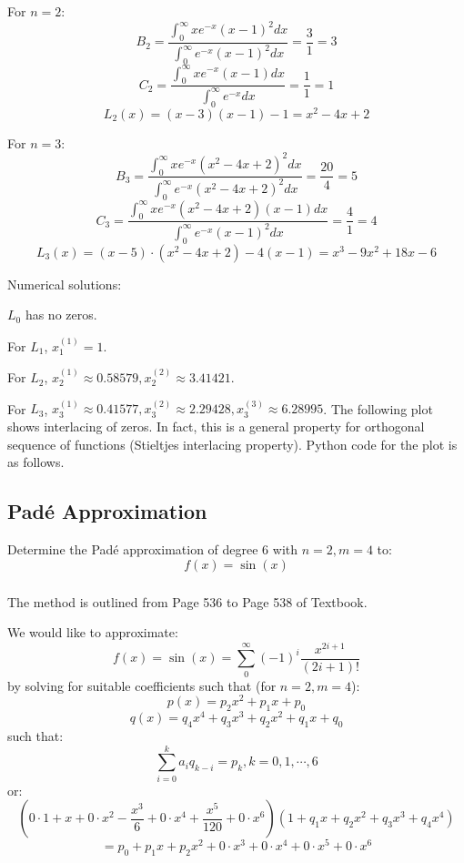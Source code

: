 \documentclass[12pt]{article} %
\newcommand{\1}[1]{\mathds{1}\left[#1\right]}
\begin{document}
For $n=2$:
$$
	B_2 = \frac{\int_0^{\infty} xe^{-x}(x-1)^2dx}{\int_0^{\infty}e^{-x}(x-1)^2dx} = \frac{3}{1} = 3
$$
$$
	C_2 = \frac{\int_0^{\infty} xe^{-x}(x-1)dx}{\int_0^{\infty} e^{-x}dx} = \frac{1}{1} = 1
$$
$$
	L_2(x) = (x-3)(x-1) - 1 = x^2-4x+2
$$

For $n=3$:
$$
	B_3 = \frac{\int_0^{\infty} xe^{-x}(x^2-4x+2)^2dx}{\int_0^{\infty} e^{-x}(x^2-4x+2)^2dx} = \frac{20}{4} = 5
$$
$$
	C_3 = \frac{\int_0^{\infty} xe^{-x}(x^2-4x+2)(x-1)dx}{\int_0^{\infty} e^{-x}(x-1)^2dx} = \frac{4}{1} = 4
$$
$$
	L_3(x) = (x-5)\cdot (x^2-4x+2)-4(x-1) = x^3-9x^2+18x-6
$$

Numerical solutions:

$L_0$ has no zeros. 

For $L_1$, $x_1^{(1)} = 1$.

For $L_2$, $x_2^{(1)} \approx 0.58579, x_2^{(2)} \approx 3.41421$.

For $L_3$, $x_3^{(1)} \approx 0.41577, x_3^{(2)} \approx 2.29428, x_3^{(3)} \approx 6.28995$. The following plot shows interlacing of zeros. In fact, this is a general property for orthogonal sequence of functions (Stieltjes interlacing property). Python code for the plot is as follows.




\subsection{Padé Approximation}
Determine the Padé approximation of degree 6 with $n = 2, m=4$ to:
$$
	f(x) = \sin(x) 
$$
\subsubsection{}
The method is outlined from Page 536 to Page 538 of Textbook.

We would like to approximate:
$$
	f(x) = \sin(x) = \sum_{0}^{\infty}(-1)^i\frac{x^{2i+1}}{(2i+1)!}
$$ by solving for suitable coefficients such that (for $n=2, m=4$):
$$
	p(x) = p_2x^2+p_1x+p_0
$$
$$
	q(x) = q_4x^4 + q_3x^3 + q_2x^2 + q_1x + q_0
$$ such that:
$$
	\sum_{i=0}^ka_iq_{k-i}=p_k, k = 0,1,\cdots, 6
$$ or:
$$
	(0\cdot 1 + x +0\cdot x^2 -\frac{x^3}{6} + 0\cdot x^4+\frac{x^5}{120} + 0\cdot x^6)(1+q_1x+q_2x^2+q_3x^3+q_4x^4) 
$$
$$= p_0+p_1x+p_2x^2+0\cdot x^3 + 0\cdot x^4 + 0\cdot x^5 + 0\cdot x^6
$$
\end{document}
